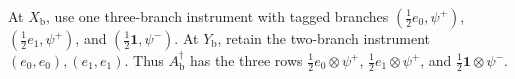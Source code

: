 At \(X_{\mathrm b}\), use one three-branch instrument with tagged branches \((\tfrac12 e_0,\psi^{+})\), \((\tfrac12 e_1,\psi^{+})\), and \((\tfrac12\mathbf 1,\psi^{-})\). At \(Y_{\mathrm b}\), retain the two-branch instrument \((e_0,e_0),(e_1,e_1)\). Thus \(A_{\mathrm b}^{\dagger}\) has the three rows \(\tfrac12 e_0\otimes\psi^{+}\), \(\tfrac12 e_1\otimes\psi^{+}\), and \(\tfrac12\mathbf 1\otimes\psi^{-}\).